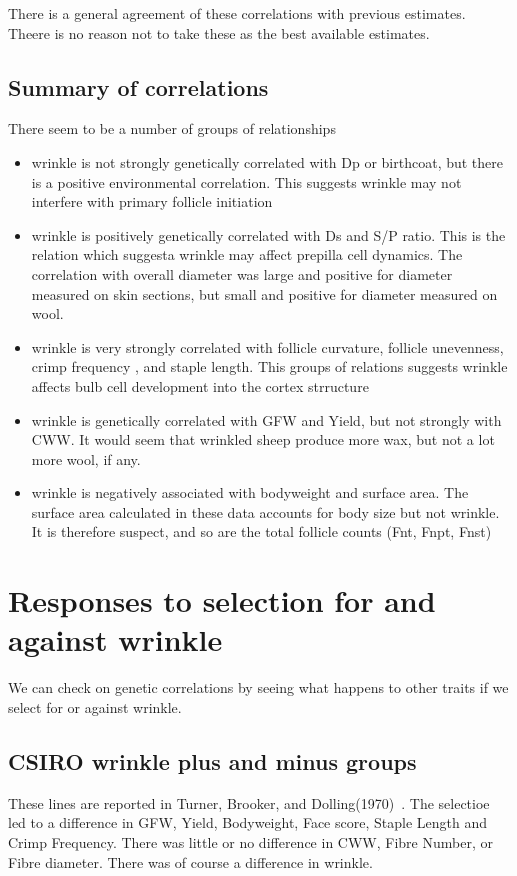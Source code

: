 \documentclass[titlepage]{article}  %
\begin{document}
There is a general agreement of these correlations with previous estimates. Theere is no reason not to take these as the best available estimates.

\subsection{Summary of correlations}
There seem to be a number of groups of relationships
\begin{itemize}
\item wrinkle is not strongly genetically correlated with Dp or birthcoat, but there is a positive environmental correlation. This suggests wrinkle may not interfere with primary follicle initiation
\item wrinkle is positively genetically correlated with Ds and S/P ratio. This is the relation which suggesta wrinkle may affect prepilla cell dynamics. The correlation with overall diameter was large and positive for diameter measured on skin sections, but small and positive for diameter measured on wool. 
\item wrinkle is very strongly correlated with follicle curvature, follicle unevenness, crimp frequency , and staple length. This groups of relations suggests wrinkle affects bulb cell development into the cortex strructure
\item wrinkle is genetically correlated with GFW and Yield, but not strongly with CWW. It would seem that wrinkled sheep produce more wax, but not a lot more wool, if any. 
\item wrinkle is negatively associated with bodyweight and surface area. The surface area calculated in these data accounts for body size but not wrinkle. It is therefore suspect, and so are the total follicle counts (Fnt, Fnpt, Fnst)
\end{itemize}


\section{Responses to selection for and against wrinkle}
We can check on genetic correlations by seeing what happens to other traits if we select for  or against wrinkle.
\subsection{CSIRO wrinkle plus and minus groups}
These lines are reported in Turner, Brooker, and Dolling(1970)~\cite{turn:70}.
The selectioe led to a difference in GFW, Yield, Bodyweight, Face score, Staple Length and Crimp Frequency. There was little or no difference in CWW, Fibre Number, or Fibre diameter.  There was of course a difference in wrinkle.
\end{document}
